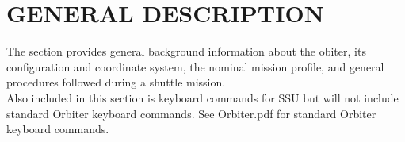 \documentclass[13pt]{article}
\begin{document}
\section{GENERAL DESCRIPTION}
\begin{multicols*}{2}
\renewcommand{\cfttoctitlefont}{\bf}
\localtableofcontents
\noindent
The section provides general background information about the obiter, its configuration and coordinate system, the nominal mission profile, and general procedures followed during a shuttle mission.
\\
Also included in this section is keyboard commands for SSU but will not include standard Orbiter keyboard commands. See Orbiter.pdf for standard Orbiter keyboard commands.
\end{multicols*}
\end{document}
